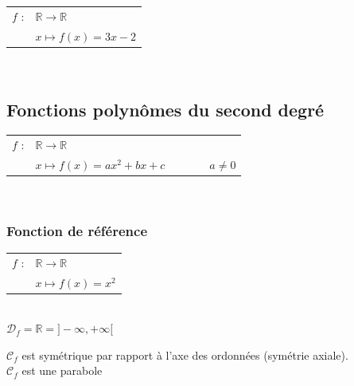 \bigskip          


\begin{tabular}{l@{$\;$ }l}
  $f$ : & $ \mathbb{R} \longrightarrow \mathbb{R}$  \\
        & $ x \longmapsto f(x) = 3x - 2$  \\
\end{tabular}\\
     
\newpage

\subsection{Fonctions polynômes du second degré}


\begin{tabular}{l@{$\;$ }l}
  $f$ : & $ \mathbb{R} \longrightarrow \mathbb{R}$  \\
        & $ x \longmapsto f(x) = ax^2 + bx + c \qquad \qquad a \neq 0$ \\
\end{tabular}\\

\subsubsection{Fonction de référence}

\begin{tabular}{l@{$\;$ }l}
  $f$ : & $ \mathbb{R} \longrightarrow \mathbb{R}$  \\
        & $ x \longmapsto f(x) = x^2$ \\
\end{tabular}\\


$\mathscr{D}_f = \mathbb{R} = ] -\infty, +\infty [ $ \\

\centerline{}

$\mathcal{C}_f$ est symétrique par rapport à l'axe des ordonnées (symétrie axiale).\\

$\mathcal{C}_f$ est une parabole \\

